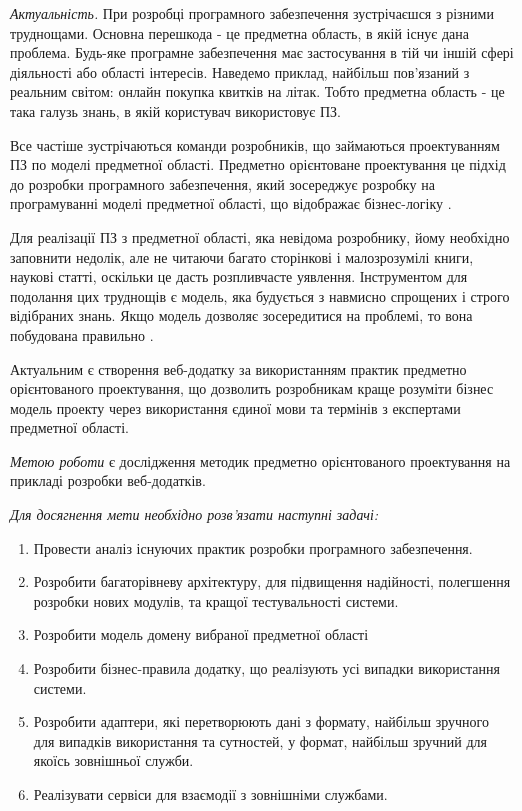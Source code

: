 
\emph{Актуальність.} При розробці програмного забезпечення зустрічаєшся з різними труднощами.
Основна перешкода - це предметна область, в якій існує дана проблема.
Будь-яке програмне забезпечення має застосування в тій чи іншій сфері діяльності або області
інтересів. Наведемо приклад, найбільш пов'язаний з реальним світом:
онлайн покупка квитків на літак. Тобто предметна область - це така галузь знань,
в якій користувач використовує ПЗ.

Все частіше зустрічаються команди розробників, що займаються проектуванням ПЗ по моделі
предметної області. Предметно орієнтоване проектування це підхід до розробки програмного
забезпечення, який зосереджує розробку на програмуванні моделі предметної області, що відображає
бізнес-логіку \cite{ddd-article}.

Для реалізації ПЗ з предметної області, яка невідома розробнику, йому необхідно заповнити
недолік, але не читаючи багато сторінкові і малозрозумілі книги, наукові статті, оскільки
це дасть розпливчасте уявлення. Інструментом для подолання цих труднощів є модель, яка
будується з навмисно спрощених і строго відібраних знань. Якщо модель дозволяє зосередитися
на проблемі, то вона побудована правильно \cite{ddd-evans}.

Актуальним є створення веб-додатку за використанням практик предметно орієнтованого
проектування, що дозволить розробникам краще розуміти бізнес модель проекту через
використання єдиної мови та термінів з експертами предметної області.

\emph{Метою роботи} є дослідження методик предметно орієнтованого проектування
на прикладі розробки веб-додатків.

\textit{Для досягнення мети необхідно розв'язати наступні задачі:}

\begin{enumerate}
  \item Провести аналіз існуючих практик розробки програмного забезпечення.
	\item Розробити багаторівневу архітектуру, для підвищення надійності,
		полегшення розробки нових модулів, та кращої тестувальності системи.
	\item Розробити модель домену вибраної предметної області
	\item Розробити бізнес-правила додатку, що реалізують усі випадки
		використання системи.
	\item Розробити адаптери, які перетворюють дані з формату,
		найбільш зручного для випадків використання та сутностей,
		у формат, найбільш зручний для якоїсь зовнішньої служби.
	\item Реалізувати сервіси для взаємодії з зовнішніми службами.
\end{enumerate}

